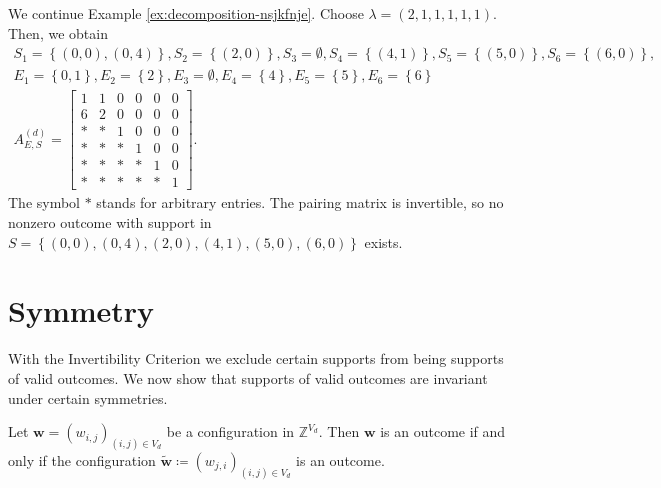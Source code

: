 \begin{example}
    We continue Example \ref{ex:decomposition-nsjkfnje}. Choose \( \lambda = (2,1,1,1,1,1) \). Then, we obtain 
    \begin{gather*}
        S_1 = \left\{ (0,0), (0,4) \right\}, S_2 = \left\{ (2,0) \right\}, S_3 = \emptyset, S_4 = \left\{ (4,1) \right\}, S_5 = \left\{ (5,0) \right\}, S_6 = \left\{ (6,0) \right\},\\
        E_1 = \left\{ 0, 1 \right\}, E_2 = \left\{ 2 \right\}, E_3 = \emptyset, E_4 = \left\{ 4 \right\}, E_5 = \left\{ 5 \right\}, E_6 = \left\{ 6 \right\}\\
        A^{(d)}_{E,S} = \begin{bmatrix}
            1 & 1 & 0 & 0 & 0 & 0 \\
            6 & 2 & 0 & 0 & 0 & 0 \\
            * & * & 1 & 0 & 0 & 0 \\
            * & * & * & 1 & 0 & 0 \\
            * & * & * & * & 1 & 0 \\
            * & * & * & * & * & 1
        \end{bmatrix}.
    \end{gather*}
    The symbol \( * \) stands for arbitrary entries. The pairing matrix is invertible, so no nonzero outcome with support in \( S = \left\{ (0,0), (0,4), (2,0), (4,1), (5,0), (6,0) \right\} \) exists.
\end{example}

\section{Symmetry}\label{sec:symmetry}

With the Invertibility Criterion we exclude certain supports from being supports of valid outcomes. We now show that supports of valid outcomes are invariant under certain symmetries.

\begin{proposition}\label{prop:symmetry}
    Let \( \mathbf{w} = (w_{i,j})_{(i,j) \in V_d} \) be a configuration in \( \mathbb{Z}^{V_d} \). Then \( \mathbf{w} \) is an outcome if and only if  the configuration \(  \tilde{\mathbf{w}} \coloneqq (w_{j,i})_{(i,j) \in V_d} \) is an outcome.
\end{proposition}

